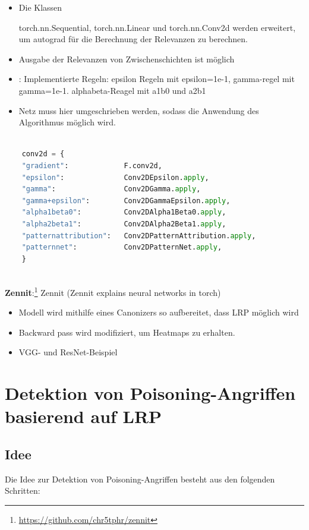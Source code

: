 \documentclass[twoside, 11pt,a4paper]{article}
\numberwithin{equation}{section}
\begin{document}
	\begin{itemize}
		\item Die Klassen
		
		torch.nn.Sequential, torch.nn.Linear und torch.nn.Conv2d werden erweitert, um autograd für die Berechnung der Relevanzen zu berechnen.
		
		\item Ausgabe der Relevanzen von Zwischenschichten ist möglich
		\item: Implementierte Regeln: epsilon Regeln mit epsilon=1e-1, gamma-regel mit gamma=1e-1. alphabeta-Reagel mit a1b0 und a2b1
		\item Netz muss hier umgeschrieben werden, sodass die Anwendung des Algorithmus möglich wird.
	\end{itemize}
	
	\begin{lstlisting}[language=Python, caption=Implementierte Regeln fhvilshoj]
	
	conv2d = {
	"gradient":             F.conv2d,
	"epsilon":              Conv2DEpsilon.apply,
	"gamma":                Conv2DGamma.apply,
	"gamma+epsilon":        Conv2DGammaEpsilon.apply,
	"alpha1beta0":          Conv2DAlpha1Beta0.apply,
	"alpha2beta1":          Conv2DAlpha2Beta1.apply,
	"patternattribution":   Conv2DPatternAttribution.apply,
	"patternnet":           Conv2DPatternNet.apply,
	}
	
	\end{lstlisting}
	
	\noindent \textbf{Zennit}:\footnote{\url{https://github.com/chr5tphr/zennit}}
	Zennit (Zennit explains neural networks in torch) 
	\begin{itemize}
		\item Modell wird mithilfe eines Canonizers so aufbereitet, dass LRP möglich wird
		\item Backward pass wird modifiziert, um Heatmaps zu erhalten.
		\item VGG- und ResNet-Beispiel
	\end{itemize}
	\section{Detektion von Poisoning-Angriffen basierend auf LRP} \label{chapter_algorithm}
	\subsection{Idee}
	Die Idee zur Detektion von Poisoning-Angriffen besteht aus den folgenden Schritten:
	
\end{document}
